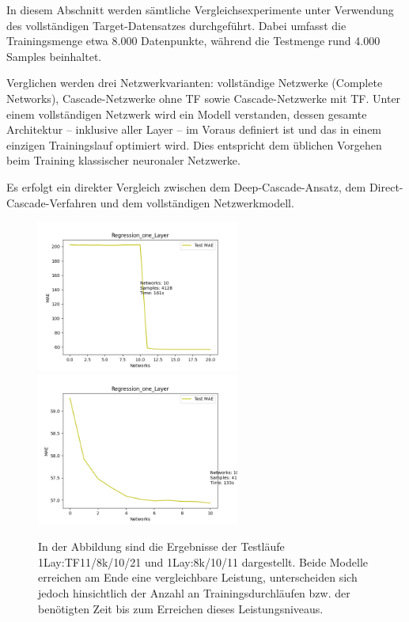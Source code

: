In diesem Abschnitt werden sämtliche Vergleichsexperimente unter Verwendung des vollständigen Target-Datensatzes durchgeführt. Dabei umfasst die 
Trainingsmenge etwa 8.000 Datenpunkte, während die Testmenge rund 4.000 Samples beinhaltet.

Verglichen werden drei Netzwerkvarianten: vollständige Netzwerke (Complete Networks), Cascade-Netzwerke ohne TF sowie 
Cascade-Netzwerke mit TF. Unter einem vollständigen Netzwerk wird ein Modell verstanden, dessen gesamte Architektur – inklusive 
aller Layer – im Voraus definiert ist und das in einem einzigen Trainingslauf optimiert wird. Dies entspricht dem üblichen Vorgehen beim 
Training klassischer neuronaler Netzwerke.

Es erfolgt ein direkter Vergleich zwischen dem Deep-Cascade-Ansatz, dem Direct-Cascade-Verfahren und dem vollständigen Netzwerkmodell.

\begin{figure}[htpb]
    \includegraphics[height=5cm]{../../Plots/ba_plots/regression_large/onelayer_ts.png}
    \includegraphics[height=5cm]{../../Plots/ba_plots/regression_large/woonelayer_ts.png}
    \caption{\label{fig:largeregr2} 
    \small{In der Abbildung sind die Ergebnisse der Testläufe 1Lay:TF11/8k/10/21 und 1Lay:8k/10/11 dargestellt. Beide Modelle erreichen am Ende 
    eine vergleichbare Leistung, unterscheiden sich jedoch hinsichtlich der Anzahl an Trainingsdurchläufen bzw. der benötigten Zeit bis zum 
    Erreichen dieses Leistungsniveaus.}}
\end{figure}

